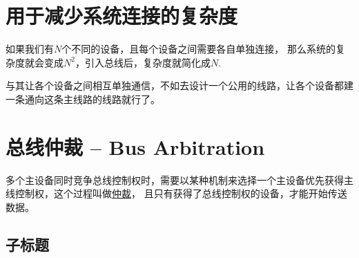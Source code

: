 \documentclass{template}
\begin{document}
\ttfamily
\section{用于减少系统连接的复杂度}
如果我们有$ N $个不同的设备，且每个设备之间需要各自单独连接，
那么系统的复杂度就会变成$ N^2 $，引入总线后，复杂度就简化成$ N $.

与其让各个设备之间相互单独通信，不如去设计一个公用的线路，让各个设备都建一条通向这条主线路的线路就行了。



\section{总线仲裁 -- Bus Arbitration}
多个主设备同时竞争总线控制权时，需要以某种机制来选择一个主设备优先获得主线控制权，这个过程叫做\underline{仲裁}，
且只有获得了总线控制权的设备，才能开始传送数据。

\begin{center}
\end{center}
\subsection{子标题}
\end{document}
